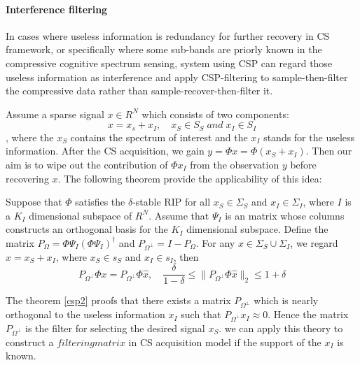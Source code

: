 \paragraph{Interference filtering}
In cases where useless information is redundancy for further recovery in CS framework, or specifically where some sub-bands are priorly known in the compressive cognitive spectrum sensing, system using CSP can regard those useless information as interference and apply CSP-filtering to sample-then-filter the compressive data rather than sample-recover-then-filter it. 

Assume a sparse signal $x \in R^N$ which consists of two components:
\begin{equation}
\label{csp1}
x = x_s + x_I, \quad x_S \in S_S\; and\; x_I \in S_I
\end{equation}
, where the $x_S$ contains the spectrum of interest and the $x_I$ stands for the useless information. After the CS acquisition, we gain $y = \Phi x = \Phi(x_S + x_I)$. Then our aim is to wipe out the contribution of $\Phi x_I$ from the observation $y$ before recovering $x$. The following theorem provide the applicability of this idea:  
\begin{theorem}\cite{davenport2010signal}
\label{csp2}
Suppose that $\Phi$ satisfies the $\delta$-stable RIP for all $x_S\in\Sigma_S$ and $x_I\in\Sigma_I$, where $I$ is a $K_I$ dimensional subspace of $R^{N}$. Assume that $\Psi_I$ is an matrix whose columns constructs an orthogonal basis for the $K_I$ dimensional subspace. Define the matrix $P_{\Omega} = \Phi\Psi_I(\Phi\Psi_I)^{\dagger}$ and $P_{\Omega^{\perp}} = I-P_{\Omega}$. For any $x \in \Sigma_S \cup \Sigma_I$, we regard $x = x_S + x_I$, where $x_S \in s_S$ and $x_I \in s_I$, then
\begin{equation}
\label{csp3}
P_{\Omega^{\perp}} \Phi x = P_{\Omega^{\perp}} \Phi \hat x ,\quad
\frac{\delta}{1-\delta} \leq \|P_{\Omega^{\perp}} \Phi \hat x\|_2 \leq 1 + \delta 
\end{equation}
\end{theorem}
The theorem \ref{csp2} proofs that there exists a matrix $P_{\Omega^{\perp}}$ which is nearly orthogonal to the useless information $x_I$ such that $P_{\Omega^{\perp}} x_I \approx 0$. Hence the matrix $P_{\Omega^{\perp}}$ is the filter for selecting the desired signal $x_S$. we can apply this theory to construct a $filtering matrix$ in CS acquisition model if the support of the $x_I$ is known. 

